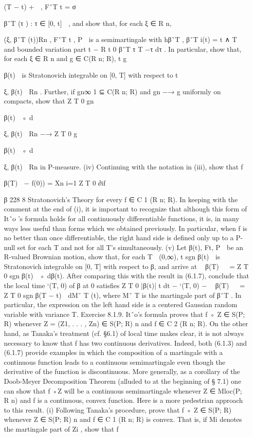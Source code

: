 \documentclass{scrartcl}
\begin{document}
(T − t)
+

, FˇT
t = σ

{βˇT
(τ ) : τ ∈ [0, t]}

, and
show that, for each ξ ∈ R
n,

(ξ, βˇT
(t))Rn , FˇT
t
, P

is a semimartingale with
hβˇT
, βˇT
i(t) = t ∧ T and bounded variation part t −
R t
0
βˇT
τ
T −τ
dτ . In particular, show that, for each ξ ∈ R
n and g ∈ C(R
n; R), t g

β(t)

is
Stratonovich integrable on [0, T] with respect to t

ξ, β(t)

Rn . Further, if
{gn}∞
1 ⊆ C(R
n; R) and gn −→ g uniformly on compacts, show that
Z T
0
gn

β(t)

◦ d

ξ, β(t)

Rn −→ Z T
0
g

β(t)

◦ d

ξ, β(t)

Rn
in P-measure.
(iv) Continuing with the notation in (iii), show that
f

β(T)

− f(0)) = Xn
i=1
Z T
0
∂if

β
228 8 Stratonovich’s Theory
for every f ∈ C
1
(R
n; R). In keeping with the comment at the end of (i), it
is important to recognize that although this form of Itˆo ’s formula holds for
all continuously differentiable functions, it is, in many ways less useful than
forms which we obtained previously. In particular, when f is no better than
once differentiable, the right hand side is defined only up to a P-null set for
each T and not for all T’s simultaneously.
(v) Let
β(t), Ft, P

be an R-valued Brownian motion, show that, for each
T ∈ (0,∞), t sgn
β(t)

is Stratonovich integrable on [0, T] with respect
to β, and arrive at

β(T)

 =
Z T
0
sgn
β(t)

◦ dβ(t).
After comparing this with the result in (6.1.7), conclude that the local time
`(T, 0) of β at 0 satisfies
Z T
0
|β(t)|
t
dt − `(T, 0) −

β(T)

 =
Z T
0
sgn
β(T − t)

dMˇ T
(t),
where Mˇ T
is the martingale part of βˇT
. In particular, the expression on the
left hand side is a centered Gaussian random variable with variance T.
Exercise 8.1.9. Itˆo’s formula proves that f ◦ Z ∈ S(P; R) whenever Z =
(Z1, . . . , Zn) ∈ S(P; R)
n and f ∈ C
2
(R
n; R). On the other hand, as Tanaka’s
treatment (cf. §6.1) of local time makes clear, it is not always necessary
to know that f has two continuous derivatives. Indeed, both (6.1.3) and
(6.1.7) provide examples in which the composition of a martingale with a
continuous function leads to a continuous semimartingale even though the
derivative of the function is discontinuous. More generally, as a corollary
of the Doob-Meyer Decomposition Theorem (alluded to at the beginning of
§ 7.1) one can show that f ◦Z will be a continuous semimartingale whenever
Z ∈ Mloc(P; R
n) and f is a continuous, convex function. Here is a more
pedestrian approach to this result.
(i) Following Tanaka’s procedure, prove that f ◦ Z ∈ S(P; R) whenever
Z ∈ S(P; R)
n and f ∈ C
1
(R
n; R) is convex. That is, if Mi denotes the
martingale part of Zi
, show that
f
\end{document}
